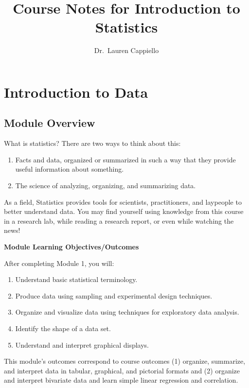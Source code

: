 \documentclass[
]{book}
\title{Course Notes for Introduction to Statistics}
\author{Dr.~Lauren Cappiello}
\date{}
\providecommand{\tightlist}{%
  \setlength{\itemsep}{0pt}\setlength{\parskip}{0pt}}
\begin{document}
\maketitle

{
\setcounter{tocdepth}{1}
\tableofcontents
}
\hypertarget{introduction-to-data}{%
\chapter{Introduction to Data}\label{introduction-to-data}}

\hypertarget{module-overview}{%
\section{Module Overview}\label{module-overview}}

What is statistics? There are two ways to think about this:

\begin{enumerate}
\def\labelenumi{\arabic{enumi}.}
\tightlist
\item
  Facts and data, organized or summarized in such a way that they provide useful information about something.
\item
  The science of analyzing, organizing, and summarizing data.
\end{enumerate}

As a field, Statistics provides tools for scientists, practitioners, and laypeople to better understand data. You may find yourself using knowledge from this course in a research lab, while reading a research report, or even while watching the news!

\textbf{Module Learning Objectives/Outcomes}

After completing Module 1, you will:

\begin{enumerate}
\def\labelenumi{\arabic{enumi}.}
\tightlist
\item
  Understand basic statistical terminology.
\item
  Produce data using sampling and experimental design techniques.
\item
  Organize and visualize data using techniques for exploratory data analysis.
\item
  Identify the shape of a data set.
\item
  Understand and interpret graphical displays.
\end{enumerate}

This module's outcomes correspond to course outcomes (1) organize, summarize, and interpret data in tabular, graphical, and pictorial formats and (2) organize and interpret bivariate data and learn simple linear regression and correlation.
\end{document}
